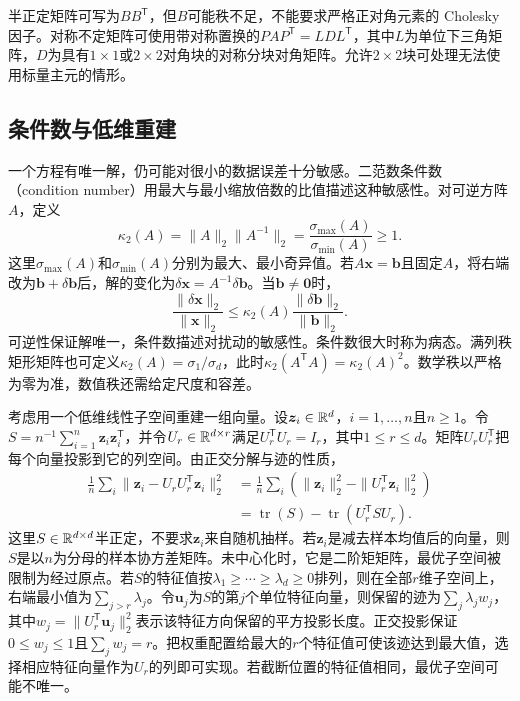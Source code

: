 半正定矩阵可写为$BB^{\mathsf T}$，但$B$可能秩不足，不能要求严格正对角元素的 Cholesky 因子。对称不定矩阵可使用带对称置换的$PAP^{\mathsf T}=LDL^{\mathsf T}$，其中$L$为单位下三角矩阵，$D$为具有$1\times1$或$2\times2$对角块的对称分块对角矩阵。允许$2\times2$块可处理无法使用标量主元的情形。

\subsection{条件数与低维重建}
一个方程有唯一解，仍可能对很小的数据误差十分敏感。二范数条件数（condition number）用最大与最小缩放倍数的比值描述这种敏感性。对可逆方阵$A$，定义
\begin{equation}
 \kappa_2(A)=\|A\|_2\|A^{-1}\|_2=\frac{\sigma_{\max}(A)}{\sigma_{\min}(A)}\geq1.
\end{equation}
这里$\sigma_{\max}(A)$和$\sigma_{\min}(A)$分别为最大、最小奇异值。若$A\bm x=\bm b$且固定$A$，将右端改为$\bm b+\delta\bm b$后，解的变化为$\delta\bm x=A^{-1}\delta\bm b$。当$\bm b\ne\bm0$时，
\begin{equation}
 \frac{\|\delta\bm x\|_2}{\|\bm x\|_2}
 \leq\kappa_2(A)\frac{\|\delta\bm b\|_2}{\|\bm b\|_2}.
\end{equation}
可逆性保证解唯一，条件数描述对扰动的敏感性。条件数很大时称为病态。满列秩矩形矩阵也可定义$\kappa_2(A)=\sigma_1/\sigma_d$，此时$\kappa_2(A^{\mathsf T}A)=\kappa_2(A)^2$。数学秩以严格为零为准，数值秩还需给定尺度和容差。

考虑用一个低维线性子空间重建一组向量。设$\bm z_i\in\mathbb{R}^d$，$i=1,\ldots,n$且$n\geq1$。令$S=n^{-1}\sum_{i=1}^n\bm z_i\bm z_i^{\mathsf T}$，并令$U_r\in\mathbb{R}^{d\times r}$满足$U_r^{\mathsf T}U_r=I_r$，其中$1\leq r\leq d$。矩阵$U_rU_r^{\mathsf T}$把每个向量投影到它的列空间。由正交分解与迹的性质，
\begin{align}
 \frac1n\sum_i\|\bm z_i-U_rU_r^{\mathsf T}\bm z_i\|_2^2
 &=\frac1n\sum_i(\|\bm z_i\|_2^2-\|U_r^{\mathsf T}\bm z_i\|_2^2)\\
 &=\operatorname{tr}(S)-\operatorname{tr}(U_r^{\mathsf T}SU_r).
 \label{eq:math-pca-reconstruction}
\end{align}
这里$S\in\mathbb{R}^{d\times d}$半正定，不要求$\bm z_i$来自随机抽样。若$\bm z_i$是减去样本均值后的向量，则$S$是以$n$为分母的样本协方差矩阵。未中心化时，它是二阶矩矩阵，最优子空间被限制为经过原点。若$S$的特征值按$\lambda_1\geq\cdots\geq\lambda_d\geq0$排列，则在全部$r$维子空间上，右端最小值为$\sum_{j>r}\lambda_j$。令$\bm u_j$为$S$的第$j$个单位特征向量，则保留的迹为$\sum_j\lambda_jw_j$，其中$w_j=\|U_r^{\mathsf T}\bm u_j\|_2^2$表示该特征方向保留的平方投影长度。正交投影保证$0\leq w_j\leq1$且$\sum_jw_j=r$。把权重配置给最大的$r$个特征值可使该迹达到最大值，选择相应特征向量作为$U_r$的列即可实现。若截断位置的特征值相同，最优子空间可能不唯一。

